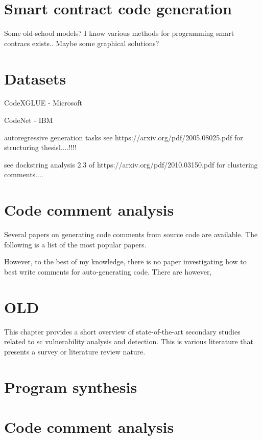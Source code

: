 \section{Smart contract code generation}
Some old-school models? I know various methods for programming smart contracs exists.. Maybe some graphical solutions?

\section{Datasets}
CodeXGLUE - Microsoft

CodeNet - IBM







autoregressive generation tasks
see https://arxiv.org/pdf/2005.08025.pdf for structuring thesisl....!!!!

see dockstring analysis 2.3 of https://arxiv.org/pdf/2010.03150.pdf for clustering comments....



\section{Code comment analysis}

Several papers on generating code comments from source code are available. The following is a list of the most popular papers.

However, to the best of my knowledge, there is no paper investigating how to best write comments for auto-generating code. There are however, 



\section{OLD}
This chapter provides a short overview of state-of-the-art secondary studies related to \acrfull{sc} vulnerability analysis and detection. This is various literature that presents a survey or literature review nature.



\section{Program synthesis}
\label{sec:program-synthesis}

\section{Code comment analysis}
\label{sec:code-comment-analysis}

